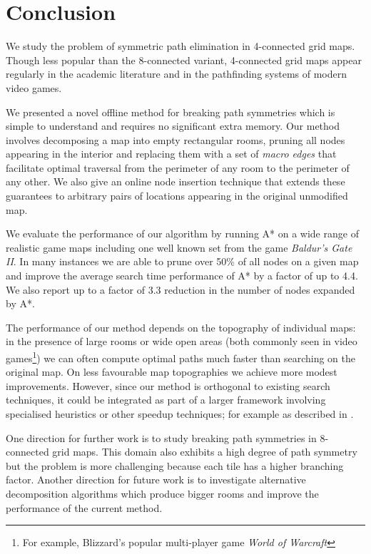 \section{Conclusion}
We study the problem of symmetric path elimination in 4-connected grid maps.
Though less popular than the 8-connected variant, 4-connected grid maps appear 
regularly in the academic literature and in the pathfinding systems of modern
video games.
\par
We presented a novel offline method for breaking path symmetries which is simple
to understand and requires no significant extra memory. 
Our method involves decomposing a map into empty rectangular rooms, pruning all nodes
appearing in the interior and replacing them with a set of \emph{macro edges}
that facilitate optimal traversal from the perimeter of any room to the perimeter
of any other.
We also give an online node insertion technique that extends these guarantees
 to arbitrary pairs of locations appearing in the original unmodified map.
\par
We evaluate the performance of our algorithm by running A* on a wide
range of realistic game maps including one well known set from the game
\emph{Baldur's Gate II}. 
In many instances we are able to prune over 50\% of all nodes on a given map
and improve the average search time performance of A* by a factor of up to 4.4.
We also report up to a factor of 3.3 reduction in the number of nodes expanded
by A*.
\par
The performance of our method depends on the topography of individual maps: 
in the presence of large rooms or wide open areas (both commonly seen in video games\footnote{For 
example, Blizzard's popular multi-player game \emph{World of Warcraft}})
we can often compute optimal paths much faster than searching on the original map. 
On less favourable map topographies we achieve more modest improvements.
However, since our method is orthogonal to existing search techniques, it could be integrated
as part of a larger framework involving specialised heuristics or other speedup techniques; 
for example as described in \cite{botea04,bjornsson05,bjornsson06}. 
\par
One direction for further work is to study breaking path symmetries
in 8-connected grid maps. 
This domain also exhibits a high degree of path symmetry but the problem is more
challenging because each tile has a higher branching factor. 
Another direction for future work is to investigate alternative decomposition
algorithms which produce bigger rooms and improve the performance of the current
method.
